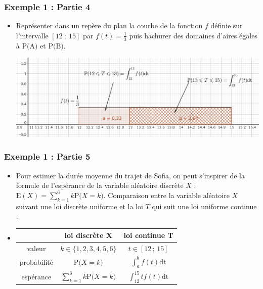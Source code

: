 \documentclass[xcolor=svgnames,t,final]{beamer}
\newcommand{\Interff}[2]{\left[#1\, ;\, #2\right]}
\newcommand{\proba}[1]{\text{P}\big(#1\big)}
\newcommand{\esperance}[1]{\text{E}\left(#1\right)}
\begin{document}
\begin{frame}

\frametitle{Exemple 1 : Partie 4}



\begin{itemize}


		\item Représenter dans un repère du plan la courbe de la fonction $f$ définie sur l'intervalle $[12~;~15]$ par $f(t)=\frac{1}{3}$ puis hachurer des domaines d'aires égales à $\proba{\text{A}}$ et $\proba{\text{B}}$.
		
		
		\begin{center}
		\includegraphics[scale=0.25]{images/exemple1.png}
		\end{center}
		
		
\end{itemize}



\end{frame}


\begin{frame}

\frametitle{Exemple 1 : Partie 5}



\begin{itemize}


		\item Pour  estimer la durée moyenne du trajet de Sofia, on peut s'inspirer de la formule de l'espérance de la variable aléatoire discrète $X$ :  $\esperance{X}=\sum_{k=1}^{6}k \proba{X=k}$. Comparaison entre la variable aléatoire $X$ suivant une loi discrète uniforme et la loi $T$ qui suit une loi uniforme continue :
\pause	 \item 		\begin{center}
	\begin{tabular}{|c|c|c|}
		\hline 
		 & loi discrète X & loi continue T \\ 
		\hline 
		valeur & $k \in \{1,2,3,4,5,6\}$ & $t \in \Interff{12}{15}$ \\ 
		\hline 
		probabilité & $\proba{X=k}$ &  $\int_{a}^{b}f(t)\text{dt}$ \\ 
		\hline 
		espérance & $\sum_{k=1}^{6}k \proba{X=k}$ & $\int_{12}^{15}tf(t)\text{dt}$ \\ 
		\hline 
		\end{tabular} 	
		\end{center}
	
		

\end{itemize}



\end{frame}
\end{document}
